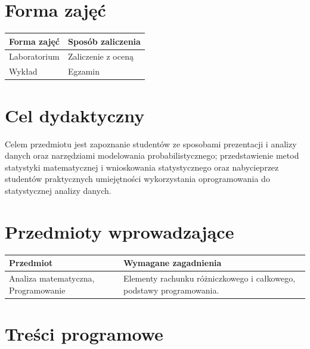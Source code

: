 \documentclass[12pt, a4paper]{article}
\begin{document}
\section{Forma zajęć}

\begin{tabular}{ll}
  \hline
  \textbf{Forma zajęć} & \textbf{Sposób zaliczenia} \\
  \hline
  Laboratorium & Zaliczenie z oceną \\
  Wykład & Egzamin \\
  \hline
\end{tabular}

\section{Cel dydaktyczny}

Celem przedmiotu jest zapoznanie studentów ze sposobami prezentacji i analizy danych oraz narzędziami modelowania probabilistycznego; przedstawienie metod statystyki matematycznej i wnioskowania statystycznego oraz nabycieprzez studentów praktycznych umiejętności wykorzystania oprogramowania do statystycznej analizy danych.

\section{Przedmioty wprowadzające}

\begin{tabularx}{\textwidth}{lX}
  \hline
  \textbf{Przedmiot} & \textbf{Wymagane zagadnienia} \\
  \hline
  Analiza matematyczna, Programowanie & Elementy rachunku różniczkowego i całkowego, podstawy programowania. \\
  \hline
\end{tabularx}

\section{Treści programowe}
\end{document}
